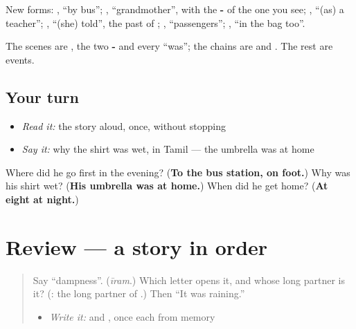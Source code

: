 \begin{culture}
New forms: \textbf{}, \textquotedblleft{}by bus\textquotedblright{}; \textbf{}, \textquotedblleft{}grandmother\textquotedblright{}, with the \textbf{-} of the one you see; \textbf{}, \textquotedblleft{}(as) a teacher\textquotedblright{}; \textbf{}, \textquotedblleft{}(she) told\textquotedblright{}, the past of \textbf{}; \textbf{}, \textquotedblleft{}passengers\textquotedblright{}; \textbf{}, \textquotedblleft{}in the bag too\textquotedblright{}.

The scenes are \textbf{ }, the two \textbf{-} and every \textquotedblleft{}was\textquotedblright{}; the chains are \textbf{} and \textbf{ }. The rest are events.
\end{culture}

\subsection*{Your turn}
\begin{itemize}
\raggedright
  \item \emph{Read it:} the story aloud, once, without stopping
  \item \emph{Say it:} why the shirt was wet, in Tamil — the umbrella was at home
\end{itemize}

\begin{tcolorbox}[breakable,colback=teal!4,colframe=teal!35!black,title={Before you move on}]
Where did he go first in the evening? (\textbf{To the bus station, on foot.}) Why was his shirt wet? (\textbf{His umbrella was at home.}) When did he get home? (\textbf{At eight at night.})
\end{tcolorbox}
\section[(review)]{Review — a story in order}

\label{lesson:TA-R285-a-story-in-order}



\begin{quote}
Say \textquotedblleft{}dampness\textquotedblright{}. (\emph{īram}.) Which letter opens it, and whose long partner is it? (\textbf{}: the long partner of \textbf{}.) Then \textquotedblleft{}It was raining.\textquotedblright{}

\begin{itemize}
\raggedright
  \item \emph{Write it:} \textbf{} and \textbf{}, once each from memory
\end{itemize}
\end{quote}

